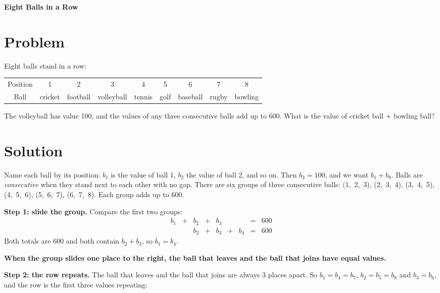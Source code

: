 \documentclass[11pt,a4paper]{article}
\begin{document}
\begin{center}{\Large\bfseries Eight Balls in a Row}\end{center}

\section*{Problem}

Eight balls stand in a row:

\begin{center}\small\renewcommand{\arraystretch}{1.6}\begin{tabular}{c|cccccccc}
\toprule
Position & 1 & 2 & 3 & 4 & 5 & 6 & 7 & 8\\
Ball & cricket & football & volleyball & tennis & golf & baseball & rugby & bowling\\
\bottomrule\end{tabular}\end{center}

The volleyball has value 100, and the values of any three consecutive balls add up to 600. What is the value of cricket ball $+$ bowling ball?

\section*{Solution}

Name each ball by its position: $b_1$ is the value of ball 1, $b_2$ the value of ball 2, and so on. Then $b_3 = 100$, and we want $b_1 + b_8$. Balls are \emph{consecutive} when they stand next to each other with no gap. There are six groups of three consecutive balls: (1,~2,~3), (2,~3,~4), (3,~4,~5), (4,~5,~6), (5,~6,~7), (6,~7,~8). Each group adds up to 600.

\textbf{\boldmath Step 1: slide the group.} Compare the first two groups:
\[
\begin{array}{ccccccccc}
b_1 & + & b_2 & + & b_3 &   &     & = & 600\\
    &   & b_2 & + & b_3 & + & b_4 & = & 600
\end{array}
\]
Both totals are 600 and both contain $b_2 + b_3$, so $b_1 = b_4$.

\textbf{\boldmath When the group slides one place to the right, the ball that leaves and the ball that joins have equal values.}

\textbf{\boldmath Step 2: the row repeats.} The ball that leaves and the ball that joins are always 3 places apart. So $b_1 = b_4 = b_7$, $b_2 = b_5 = b_8$ and $b_3 = b_6$, and the row is the first three values repeating:
\end{document}

